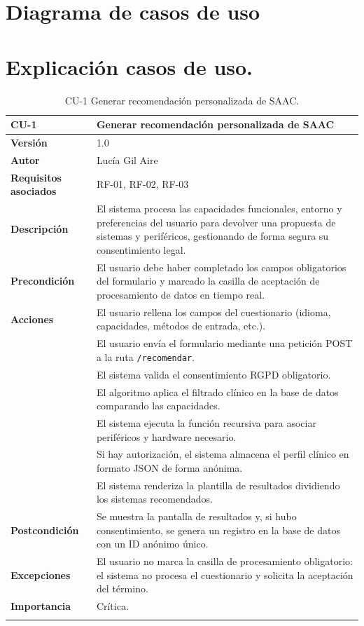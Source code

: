 \section{Diagrama de casos de uso}


\section{Explicación casos de uso.}

\begin{table}[!h]
	\centering
	\begin{tabular}{ l p{10cm} }
		\toprule
		\textbf{CU-1} & \textbf{Generar recomendación personalizada de SAAC}\\
		\midrule
		\addlinespace
		\textbf{Versión}  & 1.0 \\
		\addlinespace
		\textbf{Autor} & Lucía Gil Aire \\
		\addlinespace
		\textbf{Requisitos asociados} & RF-01, RF-02, RF-03 \\
		\addlinespace
		\textbf{Descripción}  & El sistema procesa las capacidades funcionales, entorno y preferencias del usuario para devolver una propuesta de sistemas y periféricos, gestionando de forma segura su consentimiento legal. \\
		\addlinespace
		\textbf{Precondición} & El usuario debe haber completado los campos obligatorios del formulario y marcado la casilla de aceptación de procesamiento de datos en tiempo real. \\
		\addlinespace
		\textbf{Acciones} & El usuario rellena los campos del cuestionario (idioma, capacidades, métodos de entrada, etc.). \\
		&  El usuario envía el formulario mediante una petición POST a la ruta \texttt{/recomendar}. \\
		&  El sistema valida el consentimiento RGPD obligatorio. \\
		& El algoritmo aplica el filtrado clínico en la base de datos comparando las capacidades. \\
		&  El sistema ejecuta la función recursiva para asociar periféricos y hardware necesario. \\
		&  Si hay autorización, el sistema almacena el perfil clínico en formato JSON de forma anónima. \\
		&  El sistema renderiza la plantilla de resultados dividiendo los sistemas recomendados. \\
		\addlinespace
		\textbf{Postcondición}  & Se muestra la pantalla de resultados y, si hubo consentimiento, se genera un registro en la base de datos con un ID anónimo único. \\
		\addlinespace
		\textbf{Excepciones}  & El usuario no marca la casilla de procesamiento obligatorio: el sistema no procesa el cuestionario y solicita la aceptación del término. \\
		\addlinespace
		\textbf{Importancia}   & Crítica. \\
		\addlinespace
		\bottomrule
	\end{tabular}
	\caption{CU-1 Generar recomendación personalizada de SAAC.}
\end{table}
